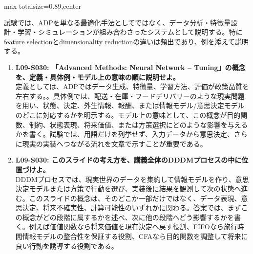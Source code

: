 \begin{minipage}[t]{0.58\textwidth}
\begin{adjustbox}{max totalsize={\textwidth}{0.89\textheight},center}
\begin{minipage}{\textwidth}
試験では、ADPを単なる最適化手法としてではなく、データ分析・特徴量設計・学習・シミュレーションが組み合わさったシステムとして説明する。特にfeature selectionとdimensionality reductionの違いは頻出であり、例を添えて説明する。\par{}\begin{enumerate}\item \textbf{L09-S030: 「Advanced Methods: Neural Network – Tuning」の概念を、定義・具体例・モデル上の意味の順に説明せよ。}\\定義としては、ADPではデータ生成、特徴量、学習方法、評価が政策品質を左右する。。具体例では、配送・在庫・フードデリバリーのような現実問題を用い、状態、決定、外生情報、報酬、または情報モデル/意思決定モデルのどこに対応するかを明示する。モデル上の意味として、この概念が目的関数、制約、状態表現、将来価値、または方策選択にどのような影響を与えるかを書く。試験では、用語だけを列挙せず、入力データから意思決定、さらに現実の実装へつながる流れを文章で示すことが重要である。\item \textbf{L09-S030: このスライドの考え方を、講義全体のDDDMプロセスの中に位置づけよ。}\\DDDMプロセスでは、現実世界のデータを集約して情報モデルを作り、意思決定モデルまたは方策で行動を選び、実装後に結果を観測して次の状態へ進む。このスライドの概念は、そのどこか一部だけではなく、データ表現、意思決定、将来不確実性、計算可能性のいずれかに関わる。答案では、まずこの概念がどの段階に属するかを述べ、次に他の段階へどう影響するかを書く。例えば価値関数なら将来価値を現在決定へ戻す役割、FIFOなら旅行時間情報モデルの整合性を保証する役割、CFAなら目的関数を調整して将来に良い行動を誘導する役割である。\end{enumerate}
\end{minipage}
\end{adjustbox}
\end{minipage}


